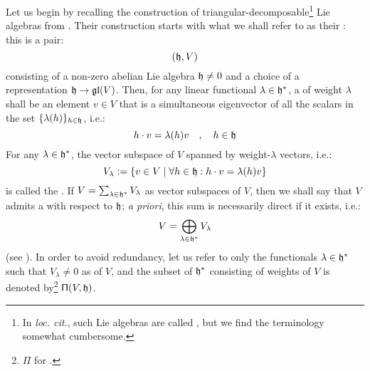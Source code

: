         Let us begin by recalling the construction of triangular-decomposable\footnote{In \textit{loc. cit.}, such Lie algebras are called , but we find the terminology somewhat cumbersome.} Lie algebras from \cite[Section 2.1]{moody_pianzola_lie_algebras_with_triangular_decompositions}. Their construction starts with what we shall refer to as their : this is a pair:
            $$(\mathfrak{h}, V)$$
        consisting of a non-zero abelian Lie algebra $\mathfrak{h} \not = 0$ and a choice of a representation $\mathfrak{h} \to \mathfrak{gl}(V)$. Then, for any linear functional $\lambda \in \mathfrak{h}^*$, a  of weight $\lambda$ shall be an element $v \in V$ that is a simultaneous eigenvector of all the scalars in the set $\{ \lambda(h) \}_{h \in \mathfrak{h}}$, i.e.:
            $$h \cdot v = \lambda(h) v \quad, \quad h \in \mathfrak{h}$$
        For any $\lambda \in \mathfrak{h}^*$, the vector subspace of $V$ spanned by weight-$\lambda$ vectors, i.e.:
            $$V_{\lambda} := \{ v \in V \mid \forall h \in \mathfrak{h}: h \cdot v = \lambda(h) v \}$$
        is called the . If $V = \sum_{\lambda \in \mathfrak{h}^*} V_{\lambda}$ as vector subspaces of $V$, then we shall say that $V$ admits a  with respect to $\mathfrak{h}$; \textit{a priori}, this sum is necessarily direct if it exists, i.e.:
            $$V = \bigoplus_{\lambda \in \mathfrak{h}^*} V_{\lambda}$$
        (see \cite[Section 2.1, Proposition 1]{moody_pianzola_lie_algebras_with_triangular_decompositions}). In order to avoid redundancy, let us refer to only the functionals $\lambda \in \mathfrak{h}^*$ such that $V_{\lambda} \not = 0$ as  of $V$, and the subset of $\mathfrak{h}^*$ consisting of weights of $V$ is denoted by\footnote{$\Pi$ for .} $\mathsf{\Pi}(V, \mathfrak{h})$.

